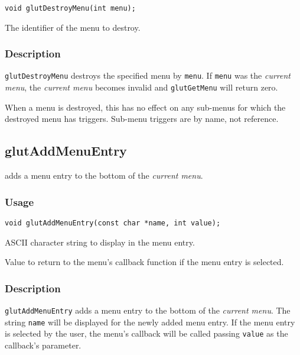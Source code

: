 \begin{verbatim}
void glutDestroyMenu(int menu);
\end{verbatim}
\begin{description}
\itemsep 0in
\item[{\tt menu}]
The identifier of the menu to destroy.
\end{description}

\subsubsection*{Description}

{\tt glutDestroyMenu} destroys the specified menu by {\tt menu}.  If {\tt menu}
was the {\em current menu}, the {\em current menu} becomes invalid and
{\tt glutGetMenu} will return zero.

When a menu is destroyed, this has no effect on any sub-menus for which the destroyed
menu has triggers.  Sub-menu triggers are by name, not reference.

\subsection{glutAddMenuEntry}

 adds a menu entry to the bottom of the {\em current menu}.

\subsubsection*{Usage}
\begin{verbatim}
void glutAddMenuEntry(const char *name, int value);
\end{verbatim}
\begin{description}
\itemsep 0in
\item[{\tt name}]
ASCII character string to display in the menu entry.
\item[{\tt value}]
Value to return to the menu's callback function if the menu entry is selected.
\end{description}

\subsubsection*{Description}

{\tt glutAddMenuEntry} adds a menu entry to the bottom of the {\em current menu}.
The string {\tt name} will be displayed for the newly added menu entry.
If the menu entry is selected by the user, the menu's callback will be called
passing {\tt value} as the callback's parameter.

